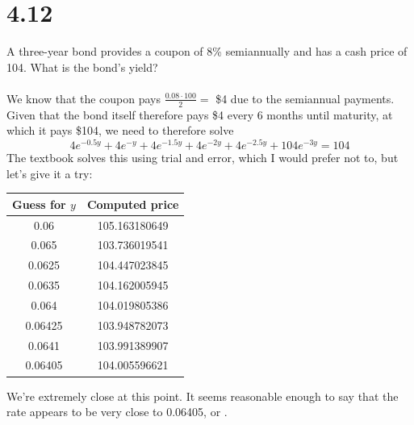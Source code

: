 \documentclass{article}
\begin{document}
{\Large 

\section*{4.12}

A three-year bond provides a coupon of 8\% semiannually and has a cash price of 104. What is the bond's yield? \\ \\
We know that the coupon pays \(\frac{0.08 \cdot 100}{2} = \) \$4 due to the semiannual payments. Given that the bond itself therefore pays \$4 every 6 months until maturity, at which it pays \$104, we need to therefore solve 
\[
  4e^{-0.5y} + 4e^{-y} + 4e^{-1.5y} + 4e^{-2y} + 4e^{-2.5y} + 104e^{-3y} = 104
\]
The textbook solves this using trial and error, which I would prefer not to, but let's give it a try:
\begin{center}
\begin{tabular}{ |c|c| } 
 \hline
 Guess for \(y\) & Computed price \\ 
 \hline
 0.06 & 105.163180649 \\ 
 \hline
 0.065 & 103.736019541 \\ 
 \hline
 0.0625 & 104.447023845 \\ 
 \hline
 0.0635 & 104.162005945 \\ 
 \hline
 0.064 & 104.019805386 \\ 
 \hline
 0.06425 & 103.948782073 \\ 
 \hline
 0.0641 & 103.991389907 \\
 \hline
 0.06405 & 104.005596621 \\
 \hline
\end{tabular}
\end{center}
We're extremely close at this point. It seems reasonable enough to say that the rate appears to be very close to 0.06405, or .

}
\end{document}
